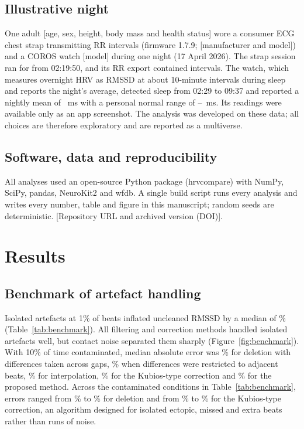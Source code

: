 \documentclass[11pt,a4paper]{article}
\newcommand{\todo}[1]{\textcolor{todo}{\textsf{[#1]}}}
\begin{document}
\subsection{Illustrative night}
One adult \todo{age, sex, height, body mass and health status} wore a consumer ECG chest strap transmitting RR intervals (firmware 1.7.9; \todo{manufacturer and model}) and a COROS watch \todo{model} during one night (17 April 2026). The strap session ran for \sessionDuration{} from 02:19:50, and its RR export contained \nRR{} intervals. The watch, which measures overnight HRV as RMSSD at about 10-minute intervals during sleep and reports the night's average,\autocite{coros_hrv} detected sleep from 02:29 to 09:37 and reported a nightly mean of \watchReported{}~ms with a personal normal range of \normalLow--\normalHigh{}~ms. Its readings were available only as an app screenshot. The analysis was developed on these data; all choices are therefore exploratory and are reported as a multiverse.

\subsection{Software, data and reproducibility}
All analyses used an open-source Python package (hrvcompare) with NumPy, SciPy, pandas, NeuroKit2 and wfdb. A single build script runs every analysis and writes every number, table and figure in this manuscript; random seeds are deterministic. \todo{Repository URL and archived version (DOI)}.

\section{Results}
\subsection{Benchmark of artefact handling}
Isolated artefacts at 1\% of beats inflated uncleaned RMSSD by a median of \benchNoneIso\% (Table~\ref{tab:benchmark}). All filtering and correction methods handled isolated artefacts well, but contact noise separated them sharply (Figure~\ref{fig:benchmark}). With 10\% of time contaminated, median absolute error was \benchDeleteTen\% for deletion with differences taken across gaps, \benchAdjacentTen\% when differences were restricted to adjacent beats, \benchInterpTen\% for interpolation, \benchKubiosTen\% for the Kubios-type correction and \benchProposedTen\% for the proposed method. Across the contaminated conditions in Table~\ref{tab:benchmark}, errors ranged from \benchDeleteMin\% to \benchDeleteMax\% for deletion and from \benchKubiosMin\% to \benchKubiosMax\% for the Kubios-type correction, an algorithm designed for isolated ectopic, missed and extra beats rather than runs of noise.
\end{document}
